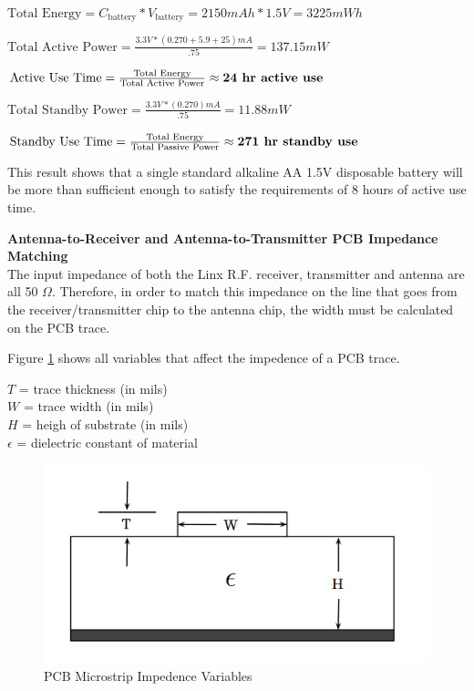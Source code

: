 \documentclass[letterpaper,10pt]{article}
\begin{document}
\begin{spacing}{1.15}
\begin{center} 
	$\textrm{Total Energy} = C_\textrm{battery} * V_\textrm{battery} = 2150 mAh * 1.5V = 3225 mWh$
	
	$\textrm{Total Active Power} = \frac{3.3 V * (0.270 + 5.9 + 25) mA}{.75} = 137.15mW$ 
	
	$\textrm{Active Use Time} = \frac{\textrm{Total Energy}}{\textrm{Total Active Power}} \approx \textrm{\textbf{24 hr active use}}$
	
	$\textrm{Total Standby Power} = \frac{3.3 V * (0.270) mA}{.75} = 11.88 mW$
	
	$\textrm{Standby Use Time} = \frac{\textrm{Total Energy}}{\textrm{Total Passive Power}} \approx \textrm{\textbf{271 hr  standby use}}$
\end{center}

This result shows that a single standard alkaline AA 1.5V disposable battery will be more than sufficient enough to satisfy the requirements of 8 hours of active use time.

\normalsize\textbf{Antenna-to-Receiver and Antenna-to-Transmitter PCB Impedance Matching} \\
The input impedance of both the Linx R.F. receiver, transmitter and antenna are all 50 $\Omega$. Therefore, in order to match this impedance on the line that goes from the receiver/transmitter chip to the antenna chip, the width must be calculated on the PCB trace. 

Figure \ref{fig:pcb-trace} shows all variables that affect the impedence of a PCB trace. 

\begin{center}
	$T $ = trace thickness (in mils) \\
	$W$ = trace width  (in mils) \\
	$H$ = heigh of substrate (in mils) \\
	$\epsilon$ = dielectric constant of material
\end{center}

\begin{figure} [H]
	\centering
	\includegraphics[scale=0.3]{PCB_Trace_Figure.png}
	\caption{PCB Microstrip Impedence Variables\label{fig:pcb-trace}}
\end{figure}


\end{spacing}
\end{document}
